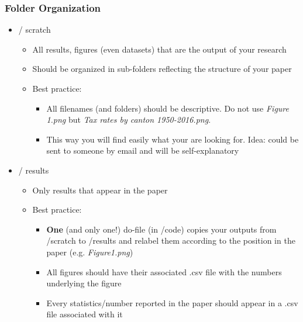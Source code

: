 \documentclass{beamer}
\begin{document}
\frame
{
	\frametitle{Folder Organization}
	
	\begin{itemize}
		\item[] / scratch
		\begin{itemize}
			\item All results, figures (even datasets) that are the output of your research
			\item Should be organized in sub-folders reflecting the structure of your paper
			\item Best practice:
			\begin{itemize}
				\item All filenames (and folders) should be descriptive. Do not use \textsl{Figure 1.png} but \textsl{Tax rates by canton 1950-2016.png}. 
				\item This way you will find easily what your are looking for. Idea: could be sent to someone by email and will be self-explanatory
			\end{itemize}
		\end{itemize}	
	\item[] / results
	\begin{itemize}
		\item Only results that appear in the paper
		\item Best practice:
		\begin{itemize}
			\item \textbf{One}  (and only one!) do-file (in /code) copies your outputs from  /scratch to /results and relabel them according to the position in the paper (e.g. \textsl{Figure1.png})
			\item All figures should have their associated .csv file with the numbers underlying the figure 
			\item Every statistics/number reported in the paper should appear in a .csv file associated with it 
		\end{itemize}
	\end{itemize}	
	\end{itemize}	
	
}
\end{document}
